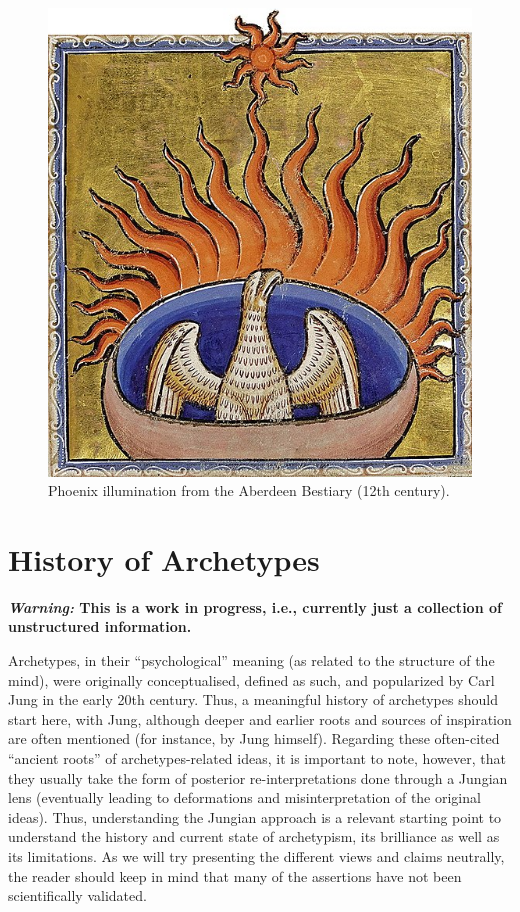 \documentclass[
]{book}
\begin{document}
\begin{figure}

{\centering \includegraphics[width=\textwidth]{img/phoenix_aberdeen_bestiary} 

}

\caption{Phoenix illumination from the Aberdeen Bestiary (12th century).}\label{fig:unnamed-chunk-5}
\end{figure}

\hypertarget{history-of-archetypes}{%
\chapter{History of Archetypes}\label{history-of-archetypes}}

\textbf{\emph{Warning:} This is a work in progress, i.e., currently just a collection of unstructured information.}

Archetypes, in their ``psychological'' meaning (as related to the structure of the mind), were originally conceptualised, defined as such, and popularized by Carl Jung in the early 20th century. Thus, a meaningful history of archetypes should start here, with Jung, although deeper and earlier roots and sources of inspiration are often mentioned (for instance, by Jung himself). Regarding these often-cited ``ancient roots'' of archetypes-related ideas, it is important to note, however, that they usually take the form of posterior re-interpretations done through a Jungian lens (eventually leading to deformations and misinterpretation of the original ideas). Thus, understanding the Jungian approach is a relevant starting point to understand the history and current state of archetypism, its brilliance as well as its limitations. As we will try presenting the different views and claims neutrally, the reader should keep in mind that many of the assertions have not been scientifically validated.
\end{document}
